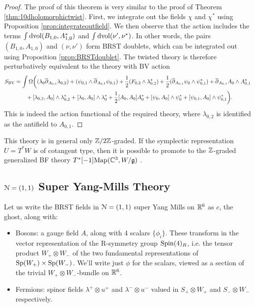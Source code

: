 \documentclass[10pt, oneside]{article}
\begin{document}
\begin{proof}
The proof of this theorem is very similar to the proof of Theorem \ref{thm:10dholomorphictwist}.  First, we integrate out the fields $\chi$ and $\chi^*$ using Proposition \ref{prop:integrateoutfield}.  We then observe that the action includes the terms $\int \operatorname{dvol}  (B_{1,0}, A_{1,0}^*)$ and  $\int \operatorname{dvol} (\nu', \nu^*)$.  In other words, the pairs $(B_{1,0}, A_{1,0})$ and $(\nu, \nu')$ form BRST doublets, which can be integrated out using Proposition \ref{prop:BRSTdoublet}.  The twisted theory is therefore perturbatively equivalent to the theory with BV action 
\begin{align*}
 S_{\mathrm{BV}} &= \int \Omega \bigg( (\lambda_0 \overline{\partial}_{A_{0,1}} \lambda_{0,2})  + (\psi_{0,1} \wedge \overline{\partial}_{A_{0,1}} \psi_{0,1}) + \frac 12 (F_{0,2} \wedge \lambda_{0,2}^*) + \frac 12( \overline{\partial}_{A_{0,1}} \psi_0 \wedge \psi_{0,1}^*) +  \overline{\partial}_{A_{0, 1}} A_0\wedge A_{0, 1}^* \\ 
  &\qquad  + [\lambda_{0,2}, A_0]\wedge \lambda_{0,2}^* + [\lambda_{0}, A_0]\wedge \lambda_{0}^* + \frac{1}{2}[A_0, A_0]A_0^* +  [\psi_{0}, A_0]\wedge \psi_{0}^* + [\psi_{0,1}, A_0]\wedge \psi_{0,1}^*  \bigg).
\end{align*}
This is indeed the action functional of the required theory, where $\lambda_{0,2}$ is identified as the antifield to $A_{0,1}$.
\end{proof}

\begin{remark}
This theory is in general only $\mathbb Z/2\mathbb Z$-graded.  If the symplectic representation $U = T^*W$ is of cotangent type, then it is possible to promote to the $\mathbb Z$-graded generalized BF theory $T^*[-1]\mathrm{Map}(\mathbb C^3, W/\mathfrak{g})$ .
\end{remark}


\subsection{$\mathcal{N} = (1,1)$ Super Yang-Mills Theory}

Let us write the BRST fields in $\mathcal{N}=(1,1)$ super Yang Mills on $\mathbb R^6$ as $c$, the ghost, along with:
\begin{itemize}
 \item Bosons: a gauge field $A$, along with 4 scalars $\{\phi_i\}$.  These transform in the vector representation of the R-symmetry group $\mathrm{Spin}(4)_R$, i.e. the tensor product $W_+ \otimes W_-$ of the two fundamental representations of $\mathrm{Sp}(W_+) \times \mathrm{Sp}(W_-)$.  We'll write just $\phi$ for the scalars, viewed as a section of the trivial $W_+ \otimes W_-$-bundle on $\mathbb R^6$.
 \item Fermions: spinor fields $\lambda^+ \otimes u^+$ and $\lambda^- \otimes u^-$ valued in $S_+ \otimes W_+$ and $S_- \otimes W_-$ respectively.
\end{itemize}
\end{document}
